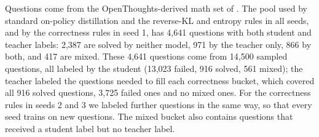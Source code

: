 \documentclass[11pt]{article}
\begin{document}
Questions come from the OpenThoughts-derived math set of \citet{zhao2026openthoughtsdata}.
The pool used by standard on-policy distillation and the reverse-KL and entropy rules in all seeds, and by the correctness rules in seed 1, has 4,641 questions with both student and teacher labels: 2,387 are solved by neither model, 971 by the teacher only, 866 by both, and 417 are mixed.
These 4,641 questions come from 14,500 sampled questions, all labeled by the student (13,023 failed, 916 solved, 561 mixed); the teacher labeled the questions needed to fill each correctness bucket, which covered all 916 solved questions, 3,725 failed ones and no mixed ones.
For the correctness rules in seeds 2 and 3 we labeled further questions in the same way, so that every seed trains on new questions.
The mixed bucket also contains questions that received a student label but no teacher label.
\end{document}
